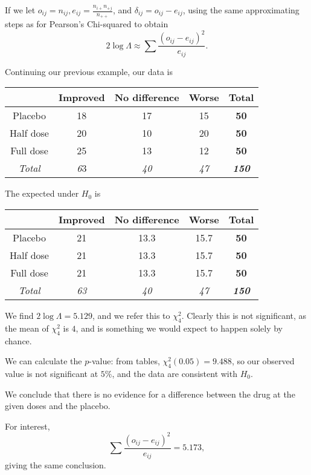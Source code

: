 \documentclass[a4paper]{article}
\begin{document}
If we let $o_{ij}= n_{ij}, e_{ij} = \frac{n_{i+}n_{+j}}{n_{++}}$, and $\delta_{ij} = o_{ij} - e_{ij}$, using the same approximating steps as for Pearson's Chi-squared to obtain
\[
  2\log \Lambda \approx \sum \frac{(o_{ij} - e_{ij})^2}{e_{ij}}.
\]
\begin{eg}
  Continuing our previous example, our data is
  \begin{center}
    \begin{tabular}{ccccc}
      \toprule
      & Improved & No difference & Worse & \textbf{Total}\\\midrule
      Placebo & 18 & 17 & 15 & \textbf{50} \\
      Half dose & 20 & 10 & 20 & \textbf{50} \\
      Full dose & 25 & 13 & 12& \textbf{50} \\\midrule
      \textit{Total} & \textit{6}3 & \textit{40} & \textit{47} & \textbf{\textit{150}} \\ \bottomrule
    \end{tabular}
  \end{center}
  The expected under $H_0$ is
  \begin{center}
    \begin{tabular}{ccccc}
      \toprule
      & Improved & No difference & Worse &\textbf{Total}\\\midrule
      Placebo & 21 & 13.3 & 15.7 & \textbf{50} \\
      Half dose & 21 & 13.3 & 15.7 & \textbf{50}\\
      Full dose & 21 & 13.3 & 15.7 & \textbf{50}\\\midrule
      \textit{Total}& \textit{63} & \textit{40} & \textit{47} & \textbf{\textit{150}}\\ \bottomrule
    \end{tabular}
  \end{center}
  We find $2\log \Lambda = 5.129$, and we refer this to $\chi_4^2$. Clearly this is not significant, as the mean of $\chi_4^2$ is $4$, and is something we would expect to happen solely by chance.

  We can calculate the $p$-value: from tables, $\chi_4^2(0.05) = 9.488$, so our observed value is not significant at $5\%$, and the data are consistent with $H_0$.

  We conclude that there is no evidence for a difference between the drug at the given doses and the placebo.

  For interest,
  \[
    \sum\frac{(o_{ij} - e_{ij})^2}{e_{ij}} = 5.173,
  \]
  giving the same conclusion.
\end{eg}
\end{document}

